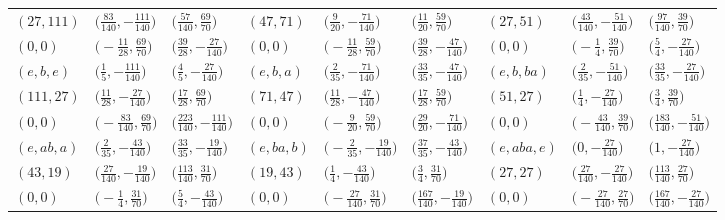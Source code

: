 \documentclass[10pt,a4paper]{amsart}
\theoremstyle{definition}
\numberwithin{equation}{section}
\begin{document}
\begin{landscape}
\begin{table}[th]
\begin{tabular}{|lll|lll|lll|}
\\
$(27, 111)$ & $\bigl(\frac{83}{140}, -\frac{111}{140}\bigr)$ & $\bigl(\frac{57}{140}, \frac{69}{70}\bigr)$ & $(47, 71)$ & $\bigl(\frac{9}{20}, -\frac{71}{140}\bigr)$ & $\bigl(\frac{11}{20}, \frac{59}{70}\bigr)$ & $(27, 51)$ & $\bigl(\frac{43}{140}, -\frac{51}{140}\bigr)$ & $\bigl(\frac{97}{140}, \frac{39}{70}\bigr)$
\\
$(0, 0)$ & $\bigl(-\frac{11}{28}, \frac{69}{70}\bigr)$ & $\bigl(\frac{39}{28}, -\frac{27}{140}\bigr)$ & $(0, 0)$ & $\bigl(-\frac{11}{28}, \frac{59}{70}\bigr)$ & $\bigl(\frac{39}{28}, -\frac{47}{140}\bigr)$ & $(0, 0)$ & $\bigl(-\frac{1}{4}, \frac{39}{70}\bigr)$ & $\bigl(\frac{5}{4}, -\frac{27}{140}\bigr)$
\\\hline
$(e, b, e)$ & $\bigl(\frac{1}{5}, -\frac{111}{140}\bigr)$ & $\bigl(\frac{4}{5}, -\frac{27}{140}\bigr)$ & $(e, b, a)$ & $\bigl(\frac{2}{35}, -\frac{71}{140}\bigr)$ & $\bigl(\frac{33}{35}, -\frac{47}{140}\bigr)$ & $(e, b, ba)$ & $\bigl(\frac{2}{35}, -\frac{51}{140}\bigr)$ & $\bigl(\frac{33}{35}, -\frac{27}{140}\bigr)$
\\
$(111, 27)$ & $\bigl(\frac{11}{28}, -\frac{27}{140}\bigr)$ & $\bigl(\frac{17}{28}, \frac{69}{70}\bigr)$ & $(71, 47)$ & $\bigl(\frac{11}{28}, -\frac{47}{140}\bigr)$ & $\bigl(\frac{17}{28}, \frac{59}{70}\bigr)$ & $(51, 27)$ & $\bigl(\frac{1}{4}, -\frac{27}{140}\bigr)$ & $\bigl(\frac{3}{4}, \frac{39}{70}\bigr)$
\\
$(0, 0)$ & $\bigl(-\frac{83}{140}, \frac{69}{70}\bigr)$ & $\bigl(\frac{223}{140}, -\frac{111}{140}\bigr)$ & $(0, 0)$ & $\bigl(-\frac{9}{20}, \frac{59}{70}\bigr)$ & $\bigl(\frac{29}{20}, -\frac{71}{140}\bigr)$ & $(0, 0)$ & $\bigl(-\frac{43}{140}, \frac{39}{70}\bigr)$ & $\bigl(\frac{183}{140}, -\frac{51}{140}\bigr)$
\\\hline
$(e, ab, a)$ & $\bigl(\frac{2}{35}, -\frac{43}{140}\bigr)$ & $\bigl(\frac{33}{35}, -\frac{19}{140}\bigr)$ & $(e, ba, b)$ & $\bigl(-\frac{2}{35}, -\frac{19}{140}\bigr)$ & $\bigl(\frac{37}{35}, -\frac{43}{140}\bigr)$ & $(e, aba, e)$ & $\bigl(0, -\frac{27}{140}\bigr)$ & $\bigl(1, -\frac{27}{140}\bigr)$
\\
$(43, 19)$ & $\bigl(\frac{27}{140}, -\frac{19}{140}\bigr)$ & $\bigl(\frac{113}{140}, \frac{31}{70}\bigr)$ & $(19, 43)$ & $\bigl(\frac{1}{4}, -\frac{43}{140}\bigr)$ & $\bigl(\frac{3}{4}, \frac{31}{70}\bigr)$ & $(27, 27)$ & $\bigl(\frac{27}{140}, -\frac{27}{140}\bigr)$ & $\bigl(\frac{113}{140}, \frac{27}{70}\bigr)$
\\
$(0, 0)$ & $\bigl(-\frac{1}{4}, \frac{31}{70}\bigr)$ & $\bigl(\frac{5}{4}, -\frac{43}{140}\bigr)$ & $(0, 0)$ & $\bigl(-\frac{27}{140}, \frac{31}{70}\bigr)$ & $\bigl(\frac{167}{140}, -\frac{19}{140}\bigr)$ & $(0, 0)$ & $\bigl(-\frac{27}{140}, \frac{27}{70}\bigr)$ & $\bigl(\frac{167}{140}, -\frac{27}{140}\bigr)$

\end{tabular}
\end{table}
\end{landscape}
\end{document}

